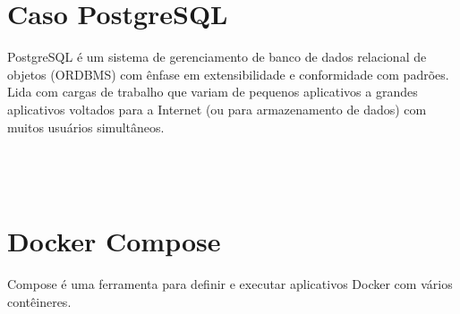 \documentclass[a4paper,11pt]{article}
\begin{document}
\section{Caso PostgreSQL}
PostgreSQL é um sistema de gerenciamento de banco de dados relacional de objetos (ORDBMS) com ênfase em extensibilidade e conformidade com padrões. Lida com cargas de trabalho que variam de pequenos aplicativos a grandes aplicativos voltados para a Internet (ou para armazenamento de dados) com muitos usuários simultâneos. \\
 \\
 \\
 \\

\section*{Docker Compose}
Compose é uma ferramenta para definir e executar aplicativos Docker com vários contêineres. \\
 \\
 \\
 \\
 \\
 \\
 \\
\end{document}
